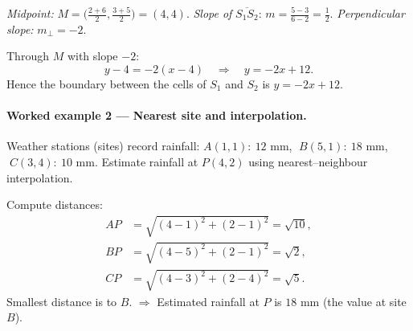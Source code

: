 \documentclass[11pt]{article}
\begin{document}
\emph{Midpoint:} \(M\!=\!\big(\frac{2+6}{2},\frac{3+5}{2}\big)=(4,4)\). \quad
\emph{Slope of } \(\overline{S_1S_2}\): \(m=\frac{5-3}{6-2}=\frac12\). \quad
\emph{Perpendicular slope:} \(m_\perp=-2\).

Through \(M\) with slope \(-2\):
\[
y-4=-2(x-4)\quad\Rightarrow\quad y=-2x+12.
\]
Hence the boundary between the cells of \(S_1\) and \(S_2\) is \(y=-2x+12\).


\paragraph*{Worked example 2 — Nearest site and interpolation.}
Weather stations (sites) record rainfall:  
\(A(1,1):\ 12\text{ mm}\), \(\;B(5,1):\ 18\text{ mm}\), \(\;C(3,4):\ 10\text{ mm}\).
Estimate rainfall at \(P(4,2)\) using nearest–neighbour interpolation.

Compute distances:
\[
\begin{aligned}
AP&=\sqrt{(4-1)^2+(2-1)^2}=\sqrt{10},\\
BP&=\sqrt{(4-5)^2+(2-1)^2}=\sqrt{2},\\
CP&=\sqrt{(4-3)^2+(2-4)^2}=\sqrt{5}.
\end{aligned}
\]
Smallest distance is to \(B\).  
\(\Rightarrow\) Estimated rainfall at \(P\) is \(18\text{ mm}\) (the value at site \(B\)).
\end{document}
